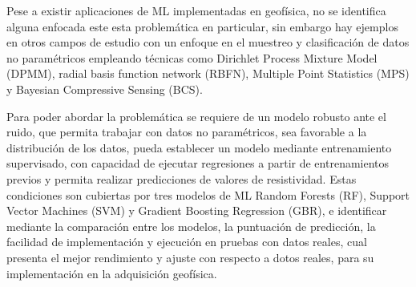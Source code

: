 Pese a existir aplicaciones de ML implementadas en geofísica, no se identifica alguna enfocada este esta problemática en particular, sin embargo hay ejemplos en otros campos de estudio con un enfoque en el muestreo y clasificación de datos no paramétricos \citep{entezami2022non, bkassiny2013multidimensional, shi2021non} empleando técnicas como Dirichlet Process Mixture Model (DPMM), radial basis function network (RBFN),  Multiple Point Statistics (MPS) y Bayesian Compressive Sensing (BCS).

Para poder abordar la problemática se requiere de un modelo robusto ante el ruido, que permita trabajar con datos no paramétricos, sea favorable a la distribución de los datos, pueda establecer un modelo mediante entrenamiento supervisado, con capacidad de ejecutar regresiones a partir de entrenamientos previos y permita realizar predicciones de valores de resistividad. Estas condiciones son cubiertas por tres modelos de ML Random Forests (RF), Support Vector Machines (SVM) y Gradient Boosting Regression (GBR), e identificar mediante la comparación entre los modelos, la puntuación de predicción, la facilidad de implementación y ejecución en pruebas con datos reales, cual presenta el mejor rendimiento y ajuste con respecto a dotos reales, para su implementación en la adquisición geofísica. 
